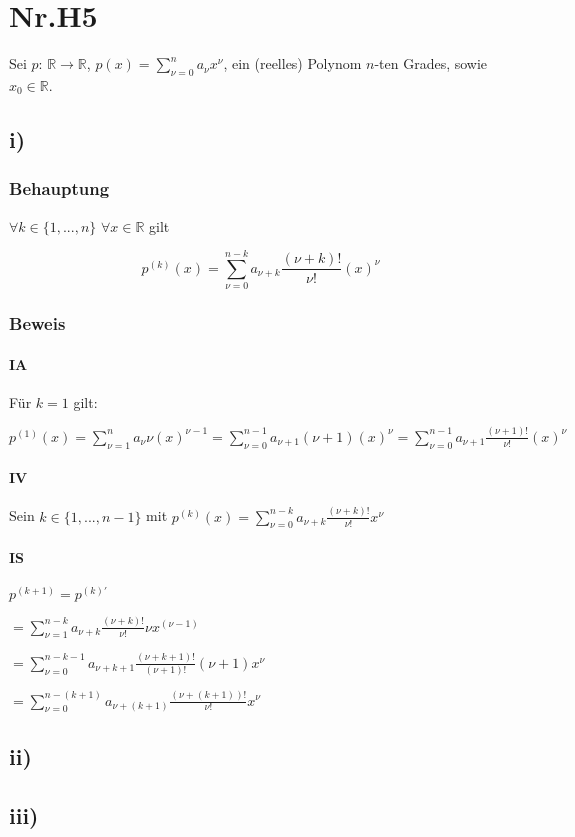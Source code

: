 \section*{Nr.H5}

Sei $p$: $\mathbb{R} \to \mathbb{R}$, $p(x)=\sum\limits^{n}_{\nu=0}a_{\nu}x^{\nu}$,
ein (reelles) Polynom $n$-ten Grades, sowie $x_{0} \in \mathbb{R}$.

\subsection*{i)}

\subsubsection*{Behauptung}

$\forall k \in \{1,...,n\}$ $\forall x \in \mathbb{R}$ gilt

\[
	p^{(k)}(x) = \sum\limits^{n-k}_{\nu=0}a_{\nu+k}\frac{(\nu+k)!}{\nu!}(x)^{\nu} 
\]

\subsubsection*{Beweis}

\paragraph*{IA}

Für $k = 1$ gilt:

$
 p^{(1)}(x)
 = \sum\limits^{n}_{\nu=1} a_{\nu} \nu (x)^{\nu-1}
 = \sum\limits^{n-1}_{\nu=0} a_{\nu+1} (\nu+1) (x)^{\nu}
 = \sum\limits^{n-1}_{\nu=0} a_{\nu+1} \frac{(\nu+1)!}{\nu!} (x)^{\nu}
$  


\paragraph*{IV}

Sein $k \in \{1,...,n-1\}$ mit 
$p^{(k)}(x) = \sum\limits^{n-k}_{\nu=0}a_{\nu+k}\frac{(\nu+k)!}{\nu!}x^{\nu} $

\paragraph*{IS}

$ p^{(k+1)} = p^{(k)\prime}$

$ = \sum\limits^{n-k}_{\nu=1} a_{\nu+k} \frac{(\nu+k)!}{\nu!} \nu x^{(\nu-1)}$

$ = \sum\limits^{n-k-1}_{\nu=0} a_{\nu+k+1} \frac{(\nu+k+1)!}{(\nu+1)!} (\nu+1)x^{\nu}$

$ = \sum\limits^{n -(k+1)}_{\nu=0} a_{\nu+(k+1)} \frac{(\nu+(k+1))!}{\nu!} x^{\nu}$

\subsection*{ii)}

\subsection*{iii)}
